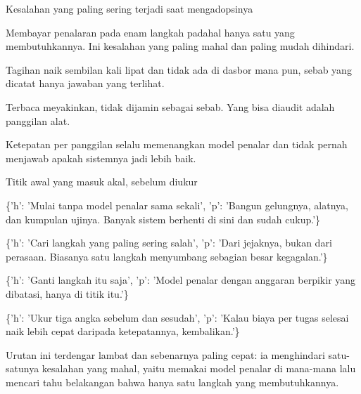 \documentclass[aspectratio=169,11pt,t]{beamer}
\begin{document}
\begin{frame}[shrink=25]{Kesalahan yang paling sering terjadi saat mengadopsinya}
\begin{minipage}[t]{0.494\textwidth}
\begin{icardbad}
Membayar penalaran pada enam langkah padahal hanya satu yang membutuhkannya. Ini kesalahan yang paling mahal dan paling mudah dihindari.
\end{icardbad}
\end{minipage}%
\hfill
\begin{minipage}[t]{0.494\textwidth}
\begin{icardbad}
Tagihan naik sembilan kali lipat dan tidak ada di dasbor mana pun, sebab yang dicatat hanya jawaban yang terlihat.
\end{icardbad}
\end{minipage}%


\vskip 4pt

\begin{minipage}[t]{0.494\textwidth}
\begin{icardbad}
Terbaca meyakinkan, tidak dijamin sebagai sebab. Yang bisa diaudit adalah panggilan alat.
\end{icardbad}
\end{minipage}%
\hfill
\begin{minipage}[t]{0.494\textwidth}
\begin{icardbad}
Ketepatan per panggilan selalu memenangkan model penalar dan tidak pernah menjawab apakah sistemnya jadi lebih baik.
\end{icardbad}
\end{minipage}%
\end{frame}

\begin{frame}[shrink=25]{Titik awal yang masuk akal, sebelum diukur}
\begin{isteps}
\item \{'h': 'Mulai tanpa model penalar sama sekali', 'p': 'Bangun gelungnya, alatnya, dan kumpulan ujinya. Banyak sistem berhenti di sini dan sudah cukup.'\}
\item \{'h': 'Cari langkah yang paling sering salah', 'p': 'Dari jejaknya, bukan dari perasaan. Biasanya satu langkah menyumbang sebagian besar kegagalan.'\}
\item \{'h': 'Ganti langkah itu saja', 'p': 'Model penalar dengan anggaran berpikir yang dibatasi, hanya di titik itu.'\}
\item \{'h': 'Ukur tiga angka sebelum dan sesudah', 'p': 'Kalau biaya per tugas selesai naik lebih cepat daripada ketepatannya, kembalikan.'\}
\end{isteps}
\begin{iband}[signal]
Urutan ini terdengar lambat dan sebenarnya paling cepat: ia menghindari satu-satunya kesalahan yang mahal, yaitu memakai model penalar di mana-mana lalu mencari tahu belakangan bahwa hanya satu langkah yang membutuhkannya.
\end{iband}
\end{frame}
\end{document}
